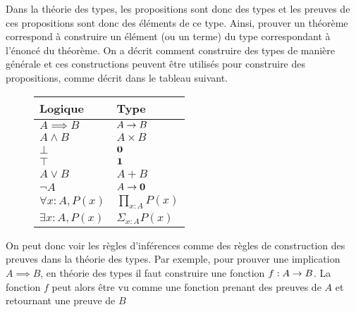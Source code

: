 \documentclass[../../rapport.tex]{subfiles}
\begin{document}
  Dans la théorie des types, les propositions sont donc des types et les preuves de ces propositions sont donc des éléments de ce type.
  Ainsi, prouver un théorème correspond à construire un élément (ou un terme) du type correspondant à l'énoncé du théorème.
  On a décrit comment construire des types de manière générale et ces constructions peuvent être utilisés pour construire des propositions,
  comme décrit dans le tableau suivant.

  \begin{figure}[ht]
    \centering
    \begin{tabular}{m{3cm} l}
      Logique & Type \vspace{0.4em} \\
      \hline
      \vspace{0.4em}
      $A \implies B$ & $A \rightarrow B$ \\
      $A \wedge B$ & $A \times B$ \\
      $\bot$ & $\operatorname{\textbf{0}}$ \\
      $\top$ & $\operatorname{\textbf{1}}$ \\
      $A \vee B$ & $A + B$ \\
      $\neg A$ & $A \rightarrow \operatorname{\textbf{0}}$ \\
      $\forall x : A, P(x)$ & $\prod_{x:A}P(x)$ \\
      $\exists x : A, P(x)$ & $\Sigma_{x:A}P(x)$ \\
    \end{tabular}
  \end{figure}

  On peut donc voir les règles d'inférences comme des règles de construction des preuves dans la théorie des types.
  Par exemple, pour prouver une implication $A \implies B$, en théorie des types il faut construire une fonction $f : A \rightarrow B$.
  La fonction $f$ peut alors être vu comme une fonction prenant des preuves de $A$ et retournant une preuve de $B$
\end{document}
